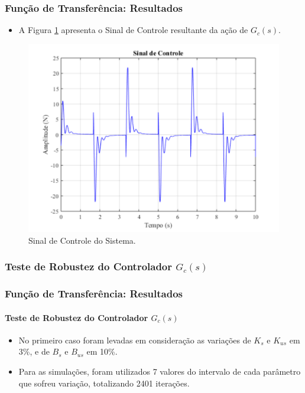 \documentclass{beamer}
\begin{document}
\begin{frame}
\frametitle{Função de Transferência: Resultados}
\begin{itemize}
\item A Figura \ref{sinalcontrole} apresenta o Sinal de Controle resultante da ação de $G_c(s)$.
\end{itemize}
\begin{figure}[H]
	\centering
\includegraphics[width=.5\columnwidth]{./imagens/sinal_de_controle.pdf}
    \renewcommand{\figurename}{Fig. 8}
    \caption{Sinal de Controle do Sistema.}
	\label{sinalcontrole}
\end{figure}
\end{frame}

\subsubsection{Teste de Robustez do Controlador $G_c(s)$}
\begin{frame}
\frametitle{Função de Transferência: Resultados}
\framesubtitle{Teste de Robustez do Controlador $G_c(s)$}
\begin{itemize}
\item No primeiro caso foram levadas em consideração as variações de $K_s$ e $K_{us}$ em 3\%, e de $B_s$ e $B_{us}$ em 10\%.
\item Para as simulações, foram utilizados 7 valores do intervalo de cada parâmetro que sofreu variação, totalizando 2401 iterações.
\end{itemize}
\end{frame}
\end{document}
